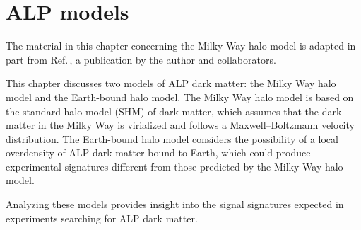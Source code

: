 \chapter{ALP models}\label{chap:theory}
\begin{jointwork}
    The material in this chapter concerning the Milky Way halo model is adapted in part from Ref.\,\cite{Yuzhe2023_FrequencyScanning}, a publication by the author and collaborators.
\end{jointwork}

This chapter discusses two models of ALP dark matter: the Milky Way halo model and the Earth-bound halo model.
The Milky Way halo model is based on the standard halo model (SHM) of dark matter, which assumes that the dark matter in the Milky Way is virialized and follows a Maxwell--Boltzmann velocity distribution.
The Earth-bound halo model considers the possibility of a local overdensity of ALP dark matter bound to Earth, which could produce experimental signatures different from those predicted by the Milky Way halo model.

Analyzing these models provides insight into the signal signatures expected in experiments searching for ALP dark matter.
